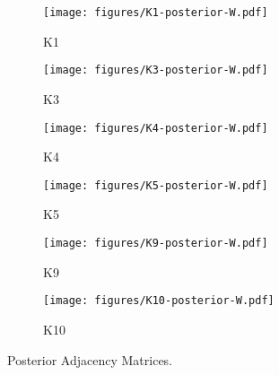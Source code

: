 \begin{figure}[t]
	\centering
	\begin{subfigure}{0.31\textwidth}
		\centering
		\texttt{[image: figures/K1-posterior-W.pdf]}
		\caption{K1}
	\end{subfigure}
	\begin{subfigure}{0.31\textwidth}
		\centering
		\texttt{[image: figures/K3-posterior-W.pdf]}
		\caption{K3}
	\end{subfigure}
	\begin{subfigure}{0.31\textwidth}
		\centering
		\texttt{[image: figures/K4-posterior-W.pdf]}
		\caption{K4} 
	\end{subfigure}
	\begin{subfigure}{0.31\textwidth}
		\centering
		\texttt{[image: figures/K5-posterior-W.pdf]}
		\caption{K5}
	\end{subfigure}
	\begin{subfigure}{0.31\textwidth}
		\centering
		\texttt{[image: figures/K9-posterior-W.pdf]}
		\caption{K9}
	\end{subfigure}
	\begin{subfigure}{0.31\textwidth}
		\centering
		\texttt{[image: figures/K10-posterior-W.pdf]}
		\caption{K10}
	\end{subfigure}
	\caption{Posterior Adjacency Matrices.}
	\label{fig:K-posterior-1}
\end{figure}
